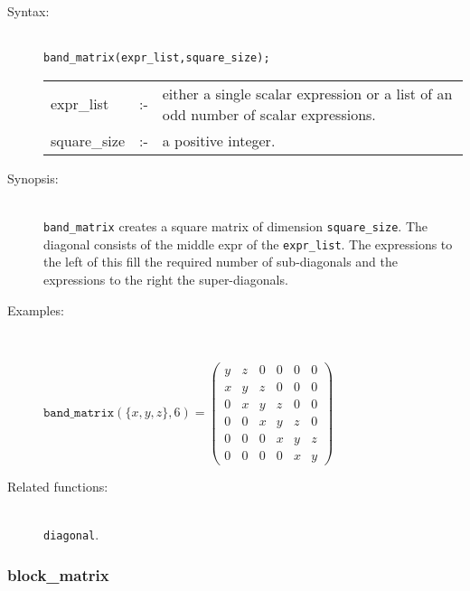 \begin{description}
\item[Syntax:]\mbox{}\\
\texttt{band\_matrix(expr\_list,square\_size);}\\[2mm]
\begin{tabular}{l l p{.72\linewidth}}
expr\_list  &:-& 
either a single scalar expression or a list of an odd number of scalar
expressions. \\
square\_size &:-& a positive integer.
\end{tabular}


\item[Synopsis:]\mbox{}\\
                \texttt{band\_matrix} creates a square matrix of
                dimension \texttt{square\_size}. The diagonal consists of the
                middle expr of the \texttt{expr\_list}. The expressions to the
                left of this fill the required number of sub-diagonals and the
                expressions to the right the super-diagonals.

\item[Examples:]\mbox{}\\
\begin{flushleft}  
\begin{math}  
\texttt{band\_matrix}(\{x,y,z\},6) = 
 \begin{pmatrix} y & z & 0 & 0 & 0 & 0 \\
                 x & y & z & 0 & 0 & 0 \\ 
                 0 & x & y & z & 0 & 0 \\
                 0 & 0 & x & y & z & 0 \\
                 0 & 0 & 0 & x & y & z \\
                 0 & 0 & 0 & 0 & x & y 
 \end{pmatrix}
\end{math}  
\end{flushleft}

\item[Related functions:]\mbox{}\\
 \texttt{diagonal}.
\end{description}


\subsubsection{block\_matrix}
\label{linalg:block_matrix}

